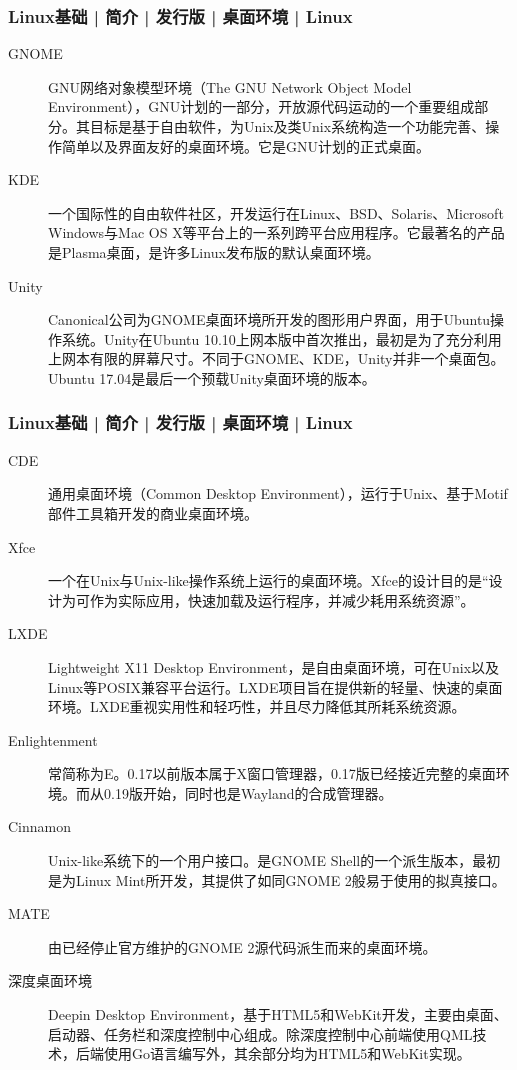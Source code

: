 \begin{frame}
  \frametitle{Linux基础 | 简介 | 发行版 | 桌面环境 | Linux}
  \begin{description}
    \item[GNOME] GNU网络对象模型环境（The GNU Network Object Model Environment），GNU计划的一部分，开放源代码运动的一个重要组成部分。其目标是基于自由软件，为Unix及类Unix系统构造一个功能完善、操作简单以及界面友好的桌面环境。它是GNU计划的正式桌面。
    \item[KDE] 一个国际性的自由软件社区，开发运行在Linux、BSD、Solaris、Microsoft Windows与Mac OS X等平台上的一系列跨平台应用程序。它最著名的产品是Plasma桌面，是许多Linux发布版的默认桌面环境。
    \item[Unity] Canonical公司为GNOME桌面环境所开发的图形用户界面，用于Ubuntu操作系统。Unity在Ubuntu 10.10上网本版中首次推出，最初是为了充分利用上网本有限的屏幕尺寸。不同于GNOME、KDE，Unity并非一个桌面包。Ubuntu 17.04是最后一个预载Unity桌面环境的版本。
  \end{description}
\end{frame}

\begin{frame}
  \frametitle{Linux基础 | 简介 | 发行版 | 桌面环境 | Linux}
  {\footnotesize
  \begin{description}
    \item[CDE] 通用桌面环境（Common Desktop Environment），运行于Unix、基于Motif部件工具箱开发的商业桌面环境。
    \item[Xfce] 一个在Unix与Unix-like操作系统上运行的桌面环境。Xfce的设计目的是“设计为可作为实际应用，快速加载及运行程序，并减少耗用系统资源”。
    \item[LXDE] Lightweight X11 Desktop Environment，是自由桌面环境，可在Unix以及Linux等POSIX兼容平台运行。LXDE项目旨在提供新的轻量、快速的桌面环境。LXDE重视实用性和轻巧性，并且尽力降低其所耗系统资源。
    \item[Enlightenment] 常简称为E。0.17以前版本属于X窗口管理器，0.17版已经接近完整的桌面环境。而从0.19版开始，同时也是Wayland的合成管理器。
    \item[Cinnamon] Unix-like系统下的一个用户接口。是GNOME Shell的一个派生版本，最初是为Linux Mint所开发，其提供了如同GNOME 2般易于使用的拟真接口。
    \item[MATE] 由已经停止官方维护的GNOME 2源代码派生而来的桌面环境。
    \item[深度桌面环境] Deepin Desktop Environment，基于HTML5和WebKit开发，主要由桌面、启动器、任务栏和深度控制中心组成。除深度控制中心前端使用QML技术，后端使用Go语言编写外，其余部分均为HTML5和WebKit实现。
  \end{description}
  }
\end{frame}

